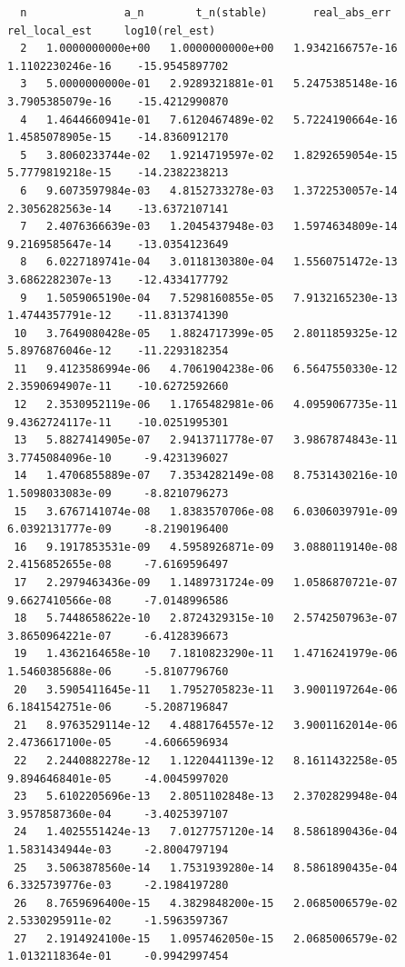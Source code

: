 \documentclass[12pt,a4paper]{article}
\begin{document}
\begin{lstlisting}
  n               a_n        t_n(stable)       real_abs_err      rel_local_est     log10(rel_est)
  2   1.0000000000e+00   1.0000000000e+00   1.9342166757e-16   1.1102230246e-16    -15.9545897702
  3   5.0000000000e-01   2.9289321881e-01   5.2475385148e-16   3.7905385079e-16    -15.4212990870
  4   1.4644660941e-01   7.6120467489e-02   5.7224190664e-16   1.4585078905e-15    -14.8360912170
  5   3.8060233744e-02   1.9214719597e-02   1.8292659054e-15   5.7779819218e-15    -14.2382238213
  6   9.6073597984e-03   4.8152733278e-03   1.3722530057e-14   2.3056282563e-14    -13.6372107141
  7   2.4076366639e-03   1.2045437948e-03   1.5974634809e-14   9.2169585647e-14    -13.0354123649
  8   6.0227189741e-04   3.0118130380e-04   1.5560751472e-13   3.6862282307e-13    -12.4334177792
  9   1.5059065190e-04   7.5298160855e-05   7.9132165230e-13   1.4744357791e-12    -11.8313741390
 10   3.7649080428e-05   1.8824717399e-05   2.8011859325e-12   5.8976876046e-12    -11.2293182354
 11   9.4123586994e-06   4.7061904238e-06   6.5647550330e-12   2.3590694907e-11    -10.6272592660
 12   2.3530952119e-06   1.1765482981e-06   4.0959067735e-11   9.4362724117e-11    -10.0251995301
 13   5.8827414905e-07   2.9413711778e-07   3.9867874843e-11   3.7745084096e-10     -9.4231396027
 14   1.4706855889e-07   7.3534282149e-08   8.7531430216e-10   1.5098033083e-09     -8.8210796273
 15   3.6767141074e-08   1.8383570706e-08   6.0306039791e-09   6.0392131777e-09     -8.2190196400
 16   9.1917853531e-09   4.5958926871e-09   3.0880119140e-08   2.4156852655e-08     -7.6169596497
 17   2.2979463436e-09   1.1489731724e-09   1.0586870721e-07   9.6627410566e-08     -7.0148996586
 18   5.7448658622e-10   2.8724329315e-10   2.5742507963e-07   3.8650964221e-07     -6.4128396673
 19   1.4362164658e-10   7.1810823290e-11   1.4716241979e-06   1.5460385688e-06     -5.8107796760
 20   3.5905411645e-11   1.7952705823e-11   3.9001197264e-06   6.1841542751e-06     -5.2087196847
 21   8.9763529114e-12   4.4881764557e-12   3.9001162014e-06   2.4736617100e-05     -4.6066596934
 22   2.2440882278e-12   1.1220441139e-12   8.1611432258e-05   9.8946468401e-05     -4.0045997020
 23   5.6102205696e-13   2.8051102848e-13   2.3702829948e-04   3.9578587360e-04     -3.4025397107
 24   1.4025551424e-13   7.0127757120e-14   8.5861890436e-04   1.5831434944e-03     -2.8004797194
 25   3.5063878560e-14   1.7531939280e-14   8.5861890435e-04   6.3325739776e-03     -2.1984197280
 26   8.7659696400e-15   4.3829848200e-15   2.0685006579e-02   2.5330295911e-02     -1.5963597367
 27   2.1914924100e-15   1.0957462050e-15   2.0685006579e-02   1.0132118364e-01     -0.9942997454

\end{lstlisting}
\end{document}
